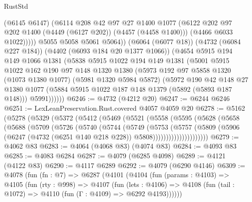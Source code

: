 \begin{lexlean}{RustStd}
\begin{coremodule}
                (@6145 @6147)
                (@6114
                  @208
                  @42
                  @97
                  @27
                  @1400
                  @1077
                  (@6122 @202 @97 @202 @1400 (@4449 (@6127 @202)) (@4457 (@4458 @1400)))
                  (@4466 @6033 @1022)))))
          @5055
          @5058
          @5061
          @5064))
      (@6064 (@6077 @18))
      (@4732 (@6084 @227 @184))
      (@4402 (@6093 @184 @20 @1377 @1066))
      (@4654
        @5915
        @194
        @149
        @1066
        @1381
        (@5838
          @5915
          @1022
          @194
          @149
          @1381
          (@5001
            @5915
            @1022
            @162
            @190
            @97
            @148
            @1320
            @1380
            (@5973
              @192
              @97
              @5858
              @1320
              (@1073 @1380 @1077)
              (@5981 @1320 @5984 @5872)
              (@5972
                @190
                @42
                @148
                @27
                @1380
                @1077
                (@5884 @5915 @1022 @187 @148 @1379 (@5892 (@5893 @187 @148)))
                @5991))))))
@6246 := @4732 (@4212 @20)
@6247 := @6244 @6246
@6251 := LexLeanPreservation.Rust.covered @4057 @4059 @20
@6278 := @5162
    (@5278
      (@5329
        (@5372
          (@5412
            (@5469
              (@5521
                (@5558
                  (@5595
                    (@5628
                      (@5658
                        (@5688
                          (@5709
                            (@5726
                              (@5740
                                (@5744
                                  (@5749
                                    (@5753
                                      (@5757
                                        (@5809
                                          (@5906
                                            (@6247
                                              (@4732 (@6251 @140 @218 @228))
                                              @5808)))))))))))))))))))))
@6279 := @4062 @83
@6283 := @4064 (@4068 @83) (@4074 @83)
@6284 := @4093 @83
@6285 := @4083 @6284
@6287 := @4079 (@6285 @4098)
@6289 := @4121 (@4122 @83)
@6290 := @4117 @6289
@6292 := @4079 (@6290 @4146)
@6309 := @4078
    (fun (fn : @7) =>
    @6287
      (@4101
        (@4104
          (fun (params : @4103) =>
          @4105
            (fun (rty : @998) =>
            @4107
              (fun (lets : @4106) =>
              @4108 (fun (tail : @1072) => @4110 (fun (Γ : @4109) => @6292 @4193))))))

\end{coremodule}
\end{lexlean}
